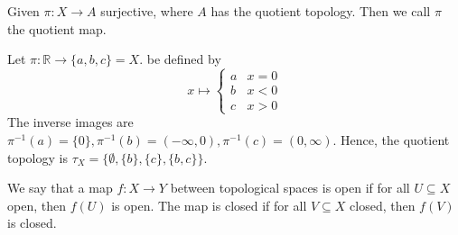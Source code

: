 \begin{definition}
    Given \( \pi: X \to A \) surjective, where \( A \) has the
    quotient topology. Then we call \( \pi \) the quotient map.
\end{definition}

\begin{example}
   Let \( \pi: \mathbb{R} \to \{ a, b, c \} = X \).
   be defined by
   \[
    x \mapsto \begin{cases}
      a & x = 0 \\
      b & x < 0 \\
      c & x > 0
    \end{cases}
   \]
   The inverse images are
   \(
     {\pi}^{-1} (a) = \{ 0 \} ,
    {\pi}^{-1} (b) = (-\infty, 0),
    {\pi}^{-1} (c) = (0, \infty)
   \).
   Hence, the quotient topology is
   \( \tau_X = \{ \emptyset, \{ b \}, \{ c \}, \{ b, c \} \}  \).
\end{example}

\begin{definition}
    We say that a map \( f: X \to Y \) between topological spaces
    is open if for all \( U \subseteq X \) open, then \( f(U) \)
    is open. The map is closed if
    for all \( V \subseteq X \) closed, then \( f(V) \) is
    closed.
\end{definition}

